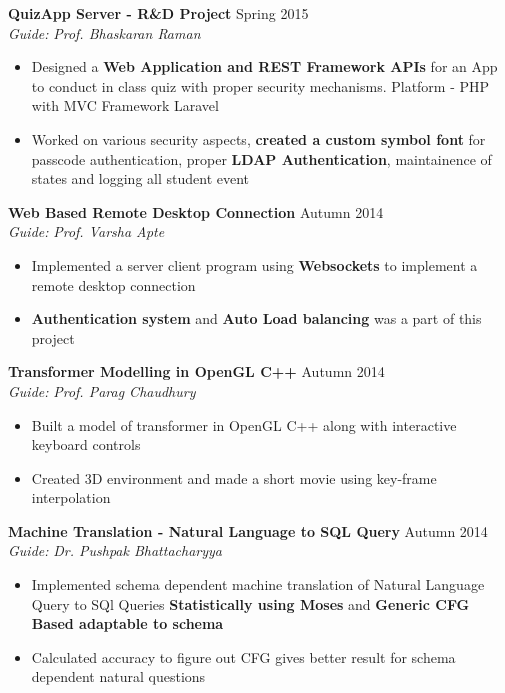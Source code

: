 \documentclass[11pt]{article} %
\begin{document}
\noindent \textbf{QuizApp Server - R\&D Project} \hfill Spring 2015 \vspace{-0.5mm}\\
\textit{Guide:} \textit{Prof. Bhaskaran Raman}
\vspace{-2mm}
\begin{itemize}
\itemsep-0.4em
\item Designed a \textbf{Web Application and REST Framework APIs} for an App to conduct in class quiz with proper security mechanisms. Platform - PHP with MVC Framework Laravel
\item Worked on various security aspects, \textbf{created a custom symbol font} for passcode authentication, proper \textbf{LDAP Authentication}, maintainence of states and logging all student event
\end{itemize}
\vspace{-1mm}

\noindent \textbf{Web Based Remote Desktop Connection} \hfill Autumn 2014 \vspace{-0.5mm}\\
\textit{Guide:} \textit{Prof. Varsha Apte}
\vspace{-2mm}
\begin{itemize}
\itemsep-0.4em
\item Implemented a server client program using \textbf{Websockets} to implement a remote desktop connection
\item \textbf{Authentication system} and \textbf{Auto Load balancing} was a part of this project
\end{itemize}
\vspace{-1mm}

\noindent \textbf{Transformer Modelling in OpenGL C++} \hfill Autumn 2014 \vspace{-0.5mm}\\
\textit{Guide:} \textit{Prof. Parag Chaudhury}
\vspace{-2mm}
\begin{itemize}
\itemsep-0.4em
\item Built a model of transformer in OpenGL C++ along with interactive keyboard controls
\item Created 3D environment and made a short movie using key-frame interpolation
\end{itemize}
\vspace{-3mm}
\newpage


\noindent \textbf{Machine Translation - Natural Language to SQL Query} \hfill Autumn 2014 \vspace{-0.5mm}\\
\textit{Guide:} \textit{Dr. Pushpak Bhattacharyya}
\vspace{-4mm}
\begin{itemize}
\itemsep-0.4em
\item Implemented schema dependent machine translation of Natural Language Query to SQl Queries \textbf{Statistically using Moses} and \textbf{Generic CFG Based adaptable to schema}
\item Calculated accuracy to figure out CFG gives better result
for schema dependent natural questions
\end{itemize}
\vspace{-3mm}
\end{document}
